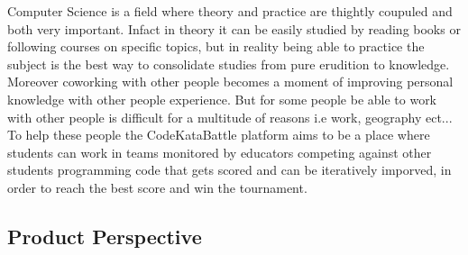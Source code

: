 Computer Science is a field where theory and practice are thightly coupuled and both very important.
Infact in theory it can be easily studied by reading books or following courses on specific topics, but in reality being able to practice the subject is the best way to consolidate studies from pure erudition to knowledge.
Moreover coworking with other people becomes a moment of improving personal knowledge with other people experience.
But for some people be able to work with other people is difficult for a multitude of reasons i.e work, geography ect... 
To help these people the CodeKataBattle platform aims to be a place where students can work in teams monitored by educators competing against other students programming code that gets scored and can be iteratively imporved, in order to reach the best score and win the tournament.
\subsection{Product Perspective}
